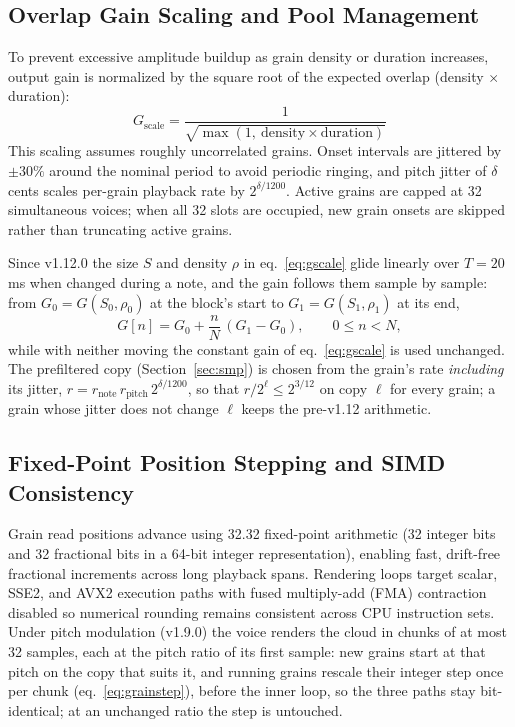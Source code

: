 \documentclass[11pt,letterpaper]{article}
\begin{document}
\subsection{Overlap Gain Scaling and Pool Management}

To prevent excessive amplitude buildup as grain density or duration increases, output gain is normalized by the
square root of the expected overlap (density $\times$ duration):
\begin{equation}\label{eq:gscale}
  G_{\mathrm{scale}} = \frac{1}{\sqrt{\max(1,\ \mathrm{density} \times \mathrm{duration})}}
\end{equation}
This scaling assumes roughly uncorrelated grains. Onset intervals are jittered by $\pm 30\%$ around the nominal period to
avoid periodic ringing, and pitch jitter of $\delta$ cents scales per-grain playback rate by $2^{\delta/1200}$. Active grains are capped
at 32 simultaneous voices; when all 32 slots are occupied, new grain onsets are skipped rather than truncating active
grains.

Since v1.12.0 the size $S$ and density $\rho$ in eq.~\eqref{eq:gscale} glide linearly over $T = 20$\,ms when changed during a
note, and the gain follows them sample by sample: from $G_0 = G(S_0,\rho_0)$ at the block's start to $G_1 = G(S_1,\rho_1)$ at its end,
\begin{equation}\label{eq:gglide}
  G[n] = G_0 + \frac{n}{N}\,(G_1 - G_0), \qquad 0 \le n < N,
\end{equation}
while with neither moving the constant gain of eq.~\eqref{eq:gscale} is used unchanged. The prefiltered copy (Section~\ref{sec:smp}) is
chosen from the grain's rate \emph{including} its jitter, $r = r_{\mathrm{note}}\,r_{\mathrm{pitch}}\,2^{\delta/1200}$, so that $r/2^{\ell} \le 2^{3/12}$ on
copy $\ell$ for every grain; a grain whose jitter does not change $\ell$ keeps the pre-v1.12 arithmetic.

\subsection{Fixed-Point Position Stepping and SIMD Consistency}

Grain read positions advance using 32.32 fixed-point arithmetic (32 integer bits and 32 fractional bits in a 64-bit
integer representation), enabling fast, drift-free fractional increments across long playback spans. Rendering loops
target scalar, SSE2, and AVX2 execution paths with fused multiply-add (FMA) contraction disabled so numerical
rounding remains consistent across CPU instruction sets.
Under pitch modulation (v1.9.0) the voice renders the cloud in chunks of at most 32 samples, each at the pitch ratio
of its first sample: new grains start at that pitch on the copy that suits it, and running grains rescale their integer
step once per chunk (eq.~\eqref{eq:grainstep}), before the inner loop, so the three paths stay bit-identical; at an unchanged
ratio the step is untouched.
\end{document}
